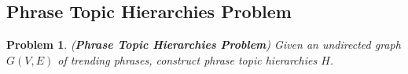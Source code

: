 \documentclass{sig-alternate}
\newtheorem{problem}{Problem}
\begin{document}
%
%
%
%

\subsection{Phrase Topic Hierarchies Problem}
\label{sec:phrase-topic-hierarchy}
\begin{problem}(\textbf{Phrase Topic Hierarchies Problem})
Given an undirected graph $G(V, E)$ of trending phrases, construct phrase topic hierarchies $H$.
\end{problem}
\end{document}
